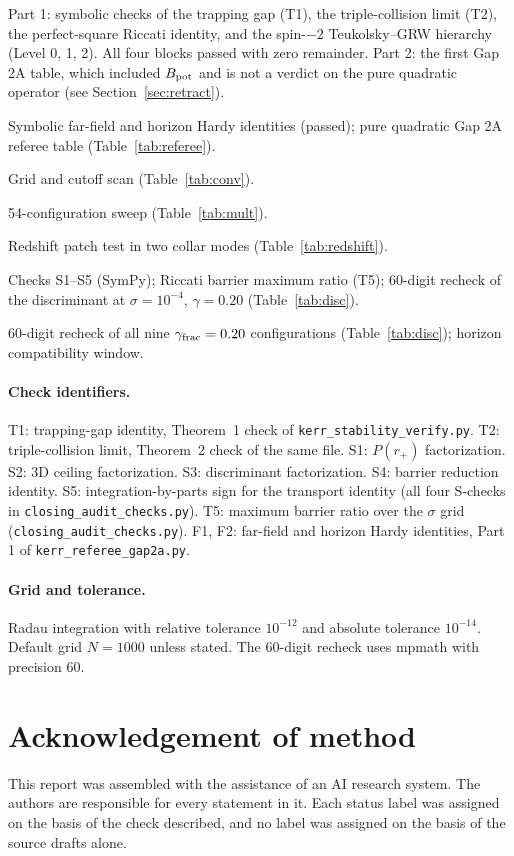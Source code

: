 \documentclass[11pt, a4paper]{article}
\theoremstyle{remark}
\theoremstyle{definition}
\begin{document}
\begin{description}[leftmargin=3.2cm, style=nextline]
\item[\texttt{kerr\_stability\_verify.py}] Part 1: symbolic checks of the trapping gap (T1), the triple-collision limit (T2), the perfect-square Riccati identity, and the spin-$-2$ Teukolsky--GRW hierarchy (Level 0, 1, 2). All four blocks passed with zero remainder. Part 2: the first Gap 2A table, which included $B_{\rm pot}$ and is not a verdict on the pure quadratic operator (see Section~\ref{sec:retract}).
\item[\texttt{kerr\_referee\_gap2a.py}] Symbolic far-field and horizon Hardy identities (passed); pure quadratic Gap 2A referee table (Table~\ref{tab:referee}).
\item[\texttt{kerr\_convergence\_sweep.py}] Grid and cutoff scan (Table~\ref{tab:conv}).
\item[\texttt{kerr\_multiplier\_sweep.py}] 54-configuration sweep (Table~\ref{tab:mult}).
\item[\texttt{kerr\_redshift\_patch.py}] Redshift patch test in two collar modes (Table~\ref{tab:redshift}).
\item[\texttt{closing\_audit\_checks.py}] Checks S1--S5 (SymPy); Riccati barrier maximum ratio (T5); 60-digit recheck of the discriminant at $\sigma=10^{-4}$, $\gamma=0.20$ (Table~\ref{tab:disc}).
\item[\texttt{extra\_checks.py}] 60-digit recheck of all nine $\gamma_{\rm frac}=0.20$ configurations (Table~\ref{tab:disc}); horizon compatibility window.
\end{description}

\paragraph{Check identifiers.} T1: trapping-gap identity, Theorem~1 check of \texttt{kerr\_stability\_verify.py}. T2: triple-collision limit, Theorem~2 check of the same file. S1: $P(r_+)$ factorization. S2: 3D ceiling factorization. S3: discriminant factorization. S4: barrier reduction identity. S5: integration-by-parts sign for the transport identity (all four S-checks in \texttt{closing\_audit\_checks.py}). T5: maximum barrier ratio over the $\sigma$ grid (\texttt{closing\_audit\_checks.py}). F1, F2: far-field and horizon Hardy identities, Part 1 of \texttt{kerr\_referee\_gap2a.py}.

\paragraph{Grid and tolerance.} Radau integration with relative tolerance $10^{-12}$ and absolute tolerance $10^{-14}$. Default grid $N=1000$ unless stated. The 60-digit recheck uses mpmath with precision 60.

\section*{Acknowledgement of method}

This report was assembled with the assistance of an AI research system. The authors are responsible for every statement in it. Each status label was assigned on the basis of the check described, and no label was assigned on the basis of the source drafts alone.
\end{document}
